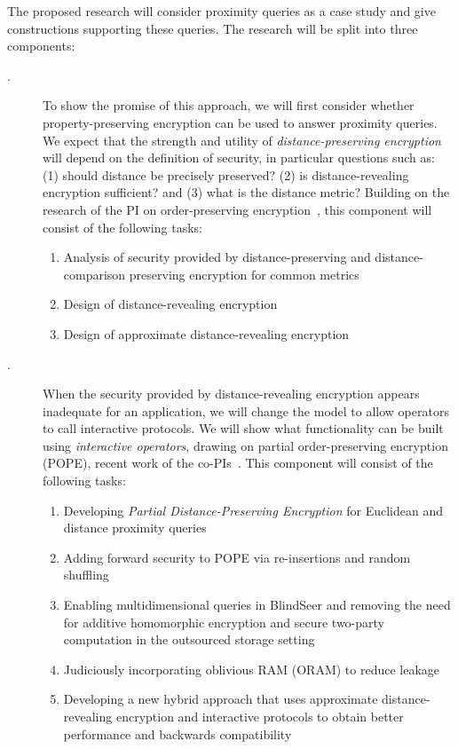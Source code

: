 \noindent
The proposed research will
consider proximity queries as a case study and give constructions supporting
these queries.  The research will be split into three components:
\begin{description}
\item[.] To show the promise of this approach, we
will first consider whether property-preserving encryption can be used
to answer proximity queries.  We expect that the strength and utility of
\emph{distance-preserving encryption} will depend on the definition of
security, in particular questions such as: (1) should distance be precisely preserved? 
(2) is distance-revealing encryption sufficient? and (3) what is the distance
metric? Building on the research of the PI on order-preserving
encryption~\cite{EC:BCLO09,C:BolCheONe11}, this component will consist
of the following tasks:
\begin{enumerate}
\setlength\itemsep{0em}
\item Analysis of security provided by distance-preserving and distance-comparison preserving encryption for common metrics
\item Design of distance-revealing encryption
\item Design of approximate distance-revealing encryption
\end{enumerate}

\item[.] When the security provided by
distance-revealing encryption appears inadequate for an application, we
will change the model to allow operators to call interactive protocols.
We will show what functionality can be built using \emph{interactive
operators}, drawing on partial order-preserving encryption (POPE), recent work of the
co-PIs~\cite{SP:PKVKMC14,CCS:RACY16}.  This component will consist of
the following tasks:
\begin{enumerate}
\setlength\itemsep{0em}
\item Developing \emph{Partial Distance-Preserving Encryption} for Euclidean and distance proximity  queries
\item Adding forward security to POPE via
  re-insertions and random shuffling
\item Enabling multidimensional queries in BlindSeer and removing the need for
  additive homomorphic encryption and secure two-party computation in the outsourced storage
  setting 
\item Judiciously incorporating oblivious RAM (ORAM) to reduce leakage
\item Developing a new hybrid approach that uses approximate
  distance-revealing encryption and interactive protocols to obtain
  better performance and backwards compatibility
\end{enumerate}


\end{description}
